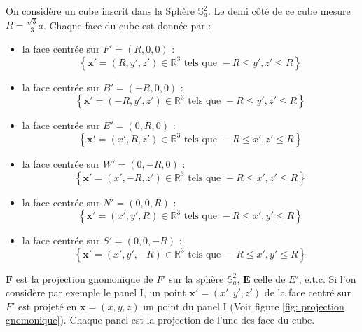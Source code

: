 On considère un cube inscrit dans la Sphère $\mathbb{S}_a^2$. Le demi côté de ce cube mesure $R=\frac{\sqrt{3}}{3}a$. Chaque face du cube est donnée par :
\begin{itemize}
\item la face centrée sur $F'=(R,0,0)$ : 
\begin{equation}
\left\lbrace
\mathbf{x}' = (R,y',z') \in \mathbb{R}^3 \text{ tels que } -R  \leq y',z' \leq R
\right\rbrace
\end{equation}

\item la face centrée sur $B'=(-R,0,0)$ : 
\begin{equation}
\left\lbrace
\mathbf{x}' = (-R,y',z') \in \mathbb{R}^3 \text{ tels que } -R  \leq y',z' \leq R
\right\rbrace
\end{equation}

\item la face centrée sur $E'=(0,R,0)$ : 
\begin{equation}
\left\lbrace
\mathbf{x}' = (x',R,z') \in \mathbb{R}^3 \text{ tels que } -R  \leq x',z' \leq R
\right\rbrace
\end{equation}

\item la face centrée sur $W'=(0,-R,0)$ : 
\begin{equation}
\left\lbrace
\mathbf{x}' = (x',-R,z') \in \mathbb{R}^3 \text{ tels que } -R  \leq x',z' \leq R
\right\rbrace
\end{equation}

\item la face centrée sur $N'=(0,0,R)$ : 
\begin{equation}
\left\lbrace
\mathbf{x}' = (x',y',R) \in \mathbb{R}^3 \text{ tels que } -R  \leq x',y' \leq R
\right\rbrace
\end{equation}

\item la face centrée sur $S'=(0,0,-R)$ : 
\begin{equation}
\left\lbrace
\mathbf{x}' = (x',y',-R) \in \mathbb{R}^3 \text{ tels que } -R  \leq x',y' \leq R
\right\rbrace
\end{equation}
\end{itemize}

$\mathbf{F}$ est la projection gnomonique de $F'$ sur la sphère $\mathbb{S}_a^2$, $\mathbf{E}$ celle de $E'$, e.t.c.
Si l'on considère par exemple le panel I, un point $\mathbf{x}'=(x',y',z')$ de la face centré sur $F'$ est projeté en $\mathbf{x} = (x,y,z)$ un point du panel I (Voir figure \ref{fig: projection gnomonique}). Chaque panel est la projection de l'une des face du cube.

